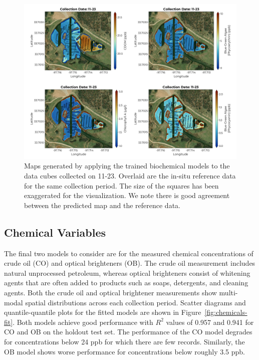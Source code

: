 \documentclass[remotesensing,article,submit,pdftex,moreauthors]{Definitions/mdpi}
\begin{document}
\begin{figure}
\centering
\includegraphics[width=\columnwidth]{paper/figures/results/maps/biochemical.pdf}
\caption{Maps generated by applying the trained biochemical models to the data cubes collected on 11-23. Overlaid are the in-situ reference data for the same collection period. The size of the squares has been exaggerated for the visualization. We note there is good agreement between the predicted map and the reference data. \label{fig:map-biochem}}
\end{figure}  


\subsection{Chemical Variables}

The final two models to consider are for the measured chemical concentrations of crude oil (CO) and optical brighteners (OB). The crude oil measurement includes natural unprocessed petroleum, whereas optical brighteners consist of whitening agents that are often added to products such as soaps, detergents, and cleaning agents. Both the crude oil and optical brightener measurements show multi-modal spatial distributions across each collection period. Scatter diagrams and quantile-quantile plots for the fitted models are shown in Figure~\ref{fig:chemicals-fit}. Both models achieve good performance with $R^2$ values of 0.957 and 0.941 for CO and OB on the holdout test set. The performance of the CO model degrades for concentrations below 24 ppb for which there are few records. Similarly, the OB model shows worse performance for concentrations below roughly 3.5 ppb.
\end{document}
